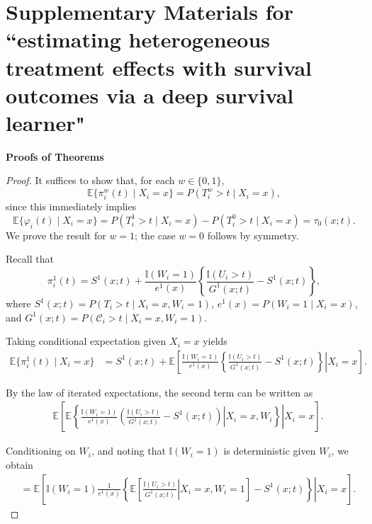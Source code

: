 \documentclass{article}
\newenvironment{proofof}[1]
{\renewcommand{\proofname}{Proof of #1}\begin{proof}}
{\end{proof}}
\begin{document}



\clearpage
\setcounter{page}{1}

\renewcommand{\thetable}{A.\arabic{table}}
\setcounter{table}{0}

\newpage 
\section*{Supplementary Materials for \\ ``estimating heterogeneous treatment effects with survival outcomes via a deep survival learner" }
\label{app1}

\noindent
{\bf Proofs of Theorems}

 \begin{proofof} {Theorem~\ref{thm:ID}:}
It suffices to show that, for each $w \in \{0,1\}$,
\[
\mathbb{E}\{\pi_i^w(t) \mid X_i = x\} = P(T_i^w > t \mid X_i = x),
\]
since this immediately implies
\[
\mathbb{E}\{\varphi_i(t) \mid X_i = x\}
=
P(T_i^1 > t \mid X_i = x) - P(T_i^0 > t \mid X_i = x)
=
\tau_0(x;t).
\]
We prove the result for $w = 1$; the case $w = 0$ follows by symmetry.

Recall that
\[
\pi_i^1(t)
=
S^1(x;t)
+
\frac{\mathbb{I}(W_i = 1)}{e^1(x)}
\left\{
\frac{\mathbb{I}(U_i > t)}{G^1(x;t)}
-
S^1(x;t)
\right\},
\]
where $S^1(x;t) = P(T_i > t \mid X_i = x, W_i = 1)$,
$e^1(x) = P(W_i = 1 \mid X_i = x)$, and
$G^1(x;t) = P(\mathcal C_i > t \mid X_i = x, W_i = 1)$.

Taking conditional expectation given $X_i = x$ yields
\begin{align*}
\mathbb{E}\{\pi_i^1(t) \mid X_i = x\}
&=
S^1(x;t)
+
\mathbb{E}\!\left[
\left.
\frac{\mathbb{I}(W_i = 1)}{e^1(x)}
\left\{
\frac{\mathbb{I}(U_i > t)}{G^1(x;t)}
-
S^1(x;t)
\right\}
\right| X_i = x
\right].
\end{align*}

By the law of iterated expectations, the second term can be written as
\begin{align*}
&\mathbb{E}\!\left[
\left.
\mathbb{E}\!\left\{
\left.
\frac{\mathbb{I}(W_i = 1)}{e^1(x)}
\left(
\frac{\mathbb{I}(U_i > t)}{G^1(x;t)}
-
S^1(x;t)
\right)
\right| X_i = x, W_i
\right\}
\right| X_i = x
\right].
\end{align*}

Conditioning on $W_i$, and noting that $\mathbb{I}(W_i = 1)$ is deterministic given $W_i$, we obtain
\begin{align*}
&=
\mathbb{E}\!\left[
\left.
\mathbb{I}(W_i = 1)
\frac{1}{e^1(x)}
\left\{
\mathbb{E}\!\left[
\left.
\frac{\mathbb{I}(U_i > t)}{G^1(x;t)}
\right| X_i = x, W_i = 1
\right]
-
S^1(x;t)
\right\}
\right| X_i = x
\right].
\end{align*}


\end{proofof}
\end{document}
